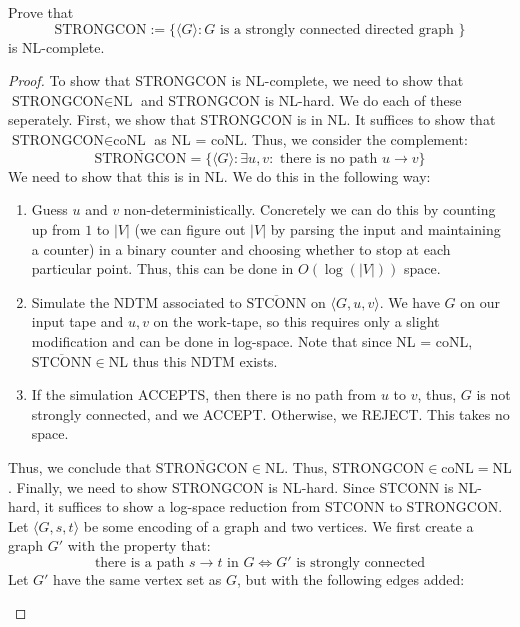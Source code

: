 \documentclass[12pt]{article}
\begin{document}




\begin{problem}{6}
    Prove that 
    \[ \text{STRONGCON} := \{ \langle G\rangle : G \text{ is a strongly connected directed graph } \}\] 
    is NL-complete.
\end{problem}

\begin{proof}
    To show that STRONGCON is NL-complete, we need to show that $\text{STRONGCON} \in \text{NL}$ and STRONGCON is NL-hard. We do each of these seperately. \bbni
    First, we show that STRONGCON is in NL. It suffices to show that $\text{STRONGCON} \in \text{coNL}$ as NL = coNL. Thus, we consider the complement: 
    \[\overline{\text{STRONGCON}} = \{ \langle G \rangle : \exists u, v: \text{ there is no path } u \to v\}\]
    We need to show that this is in NL. We do this in the following way: 
    \begin{enumerate}
        \item Guess $u$ and $v$ non-deterministically. Concretely we can do this by counting up from $1$ to $|V|$ (we can figure out $|V|$ by parsing the input and maintaining a counter) in a binary counter and choosing whether to stop at each particular point. Thus, this can be done in $O(\log(|V|))$ space. 
        \item Simulate the NDTM associated to $\overline{\text{STCONN}}$ on $\langle G, u, v \rangle$. We have $G$ on our input tape and $u, v$ on the work-tape, so this requires only a slight modification and can be done in log-space. Note that since NL = coNL, $\overline{\text{STCONN}} \in \text{NL}$ thus this NDTM exists. 
        \item If the simulation ACCEPTS, then there is no path from $u$ to $v$, thus, $G$ is not strongly connected, and we ACCEPT. Otherwise, we REJECT. This takes no space.
    \end{enumerate}
    Thus, we conclude that $\overline{\text{STRONGCON}} \in \text{NL}$. Thus, $\text{STRONGCON} \in \text{coNL} = \text{NL}$. \bbni
    Finally, we need to show STRONGCON is NL-hard. Since STCONN is NL-hard, it suffices to show a log-space reduction from STCONN to STRONGCON. \bbni 
    Let $\langle G, s, t \rangle$ be some encoding of a graph and two vertices. We first create a graph $G'$ with the property that: 
    \[ \text{there is a path } s \to t \text{ in } G \iff G' \text{ is strongly connected} \]
    Let $G'$ have the same vertex set as $G$, but with the following edges added: 
    \begin{itemize}

\end{itemize}
\end{proof}
\end{document}
